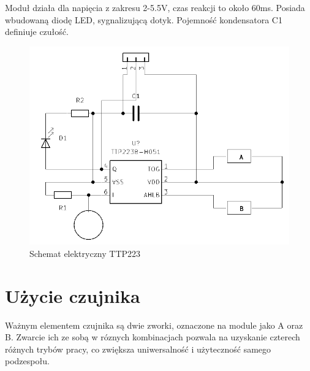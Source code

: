 \documentclass[11pt, a4paper]{article}
\begin{document}
Moduł działa dla napięcia z zakresu 2-5.5V, czas reakcji to około 60ms. Posiada wbudowaną diodę LED, sygnalizującą dotyk. Pojemność kondensatora C1 definiuje czułość.
\begin{figure}[h!]
  \centering
  \includegraphics[width=0.8\linewidth]{fig/KY-018/zasada_dzialania/dotyk.png}
  \caption{Schemat elektryczny TTP223}
  \label{fig:sub1}
\end{figure}
\vspace{0.5cm}

\newpage
\section*{Użycie czujnika}
Ważnym elementem czujnika są dwie zworki, oznaczone na module jako A oraz B. Zwarcie ich ze sobą w róznych kombinacjach pozwala na uzyskanie czterech różnych trybów pracy, co zwiększa uniwersalność i użyteczność samego podzespołu.
\end{document}
